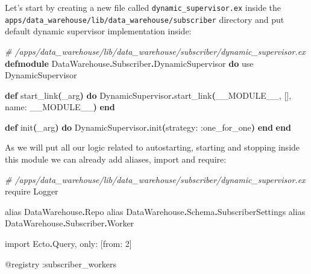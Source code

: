 \documentclass[
  oneside]{book}
\newenvironment{Shaded}{\begin{snugshade}}{\end{snugshade}}
\newcommand{\CommentTok}[1]{\textcolor[rgb]{0.56,0.35,0.01}{\textit{#1}}}
\newcommand{\ConstantTok}[1]{\textcolor[rgb]{0.56,0.35,0.01}{#1}}
\newcommand{\DecValTok}[1]{\textcolor[rgb]{0.00,0.00,0.81}{#1}}
\newcommand{\FunctionTok}[1]{\textcolor[rgb]{0.13,0.29,0.53}{\textbf{#1}}}
\newcommand{\ImportTok}[1]{#1}
\newcommand{\KeywordTok}[1]{\textcolor[rgb]{0.13,0.29,0.53}{\textbf{#1}}}
\newcommand{\NormalTok}[1]{#1}
\newcommand{\OperatorTok}[1]{\textcolor[rgb]{0.81,0.36,0.00}{\textbf{#1}}}
\newcommand{\OtherTok}[1]{\textcolor[rgb]{0.56,0.35,0.01}{#1}}
\newcommand{\VariableTok}[1]{\textcolor[rgb]{0.00,0.00,0.00}{#1}}
\begin{document}
Let's start by creating a new file called \texttt{dynamic\_supervisor.ex} inside the\\
\texttt{apps/data\_warehouse/lib/data\_warehouse/subscriber} directory and put default dynamic supervisor implementation inside:

\begin{Shaded}
\begin{Highlighting}[]
\CommentTok{\# /apps/data\_warehouse/lib/data\_warehouse/subscriber/dynamic\_supervisor.ex}
\KeywordTok{defmodule} \ConstantTok{DataWarehouse}\OperatorTok{.}\ConstantTok{Subscriber}\OperatorTok{.}\ConstantTok{DynamicSupervisor} \KeywordTok{do}
  \ImportTok{use} \ConstantTok{DynamicSupervisor}

  \KeywordTok{def}\NormalTok{ start\_link}\FunctionTok{(}\NormalTok{\_arg}\FunctionTok{)} \KeywordTok{do}
    \ConstantTok{DynamicSupervisor}\OperatorTok{.}\NormalTok{start\_link}\FunctionTok{(}\ConstantTok{\_\_MODULE\_\_}\NormalTok{, }\OtherTok{[]}\NormalTok{, }\VariableTok{name:} \ConstantTok{\_\_MODULE\_\_}\FunctionTok{)}
  \KeywordTok{end}

  \KeywordTok{def}\NormalTok{ init}\FunctionTok{(}\NormalTok{\_arg}\FunctionTok{)} \KeywordTok{do}
    \ConstantTok{DynamicSupervisor}\OperatorTok{.}\NormalTok{init}\FunctionTok{(}\VariableTok{strategy:} \VariableTok{:one\_for\_one}\FunctionTok{)}
  \KeywordTok{end}
\KeywordTok{end}
\end{Highlighting}
\end{Shaded}

As we will put all our logic related to autostarting, starting and stopping inside this module we can already add aliases, import and require:

\begin{Shaded}
\begin{Highlighting}[]
\CommentTok{\# /apps/data\_warehouse/lib/data\_warehouse/subscriber/dynamic\_supervisor.ex}
  \ImportTok{require} \ConstantTok{Logger}

  \ImportTok{alias} \ConstantTok{DataWarehouse}\OperatorTok{.}\ConstantTok{Repo}
  \ImportTok{alias} \ConstantTok{DataWarehouse}\OperatorTok{.}\ConstantTok{Schema}\OperatorTok{.}\ConstantTok{SubscriberSettings}
  \ImportTok{alias} \ConstantTok{DataWarehouse}\OperatorTok{.}\ConstantTok{Subscriber}\OperatorTok{.}\ConstantTok{Worker}

  \ImportTok{import} \ConstantTok{Ecto}\OperatorTok{.}\ConstantTok{Query}\NormalTok{, }\VariableTok{only:} \OtherTok{[}\VariableTok{from:} \DecValTok{2}\OtherTok{]}

  \OtherTok{@registry} \VariableTok{:subscriber\_workers}
\end{Highlighting}
\end{Shaded}
\end{document}
